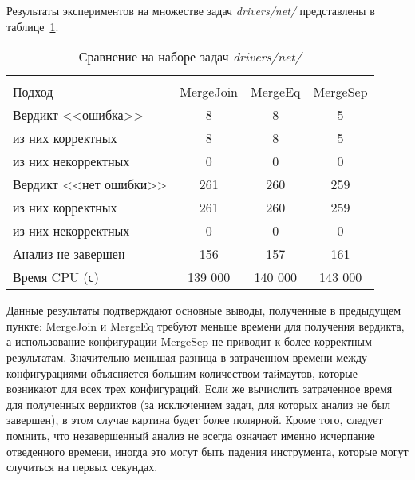 Результаты экспериментов на множестве задач \textit{drivers/net/} представлены в таблице~\ref{table-drivers-merge}.

  \begin{table}[h]\footnotesize \centering
    \caption{Сравнение на наборе задач \textit{drivers/net/}}
  	\label{table-drivers-merge}
    \begin{tabular}{ | l | c | c | c | }
      \hline
      		& 		\multicolumn{3}{c|}{\theoryraces}  \\
      Подход         				& MergeJoin	& MergeEq 	& MergeSep   \\ \hline
      Вердикт <<ошибка>> 				& 8	    	& 8  		& 5         \\ 
  \hspace{0.5cm} из них корректных 	& 8 		& 8 		& 5      \\ 
  \hspace{0.5cm} из них некорректных & 0 		& 0 		& 0        \\ \hline
      Вердикт <<нет ошибки>>  		& 261      	& 260       & 259       \\ 
  \hspace{0.5cm} из них корректных 	& 261 		& 260    	& 259        \\
  \hspace{0.5cm} из них некорректных & 0 		& 0    		& 0         \\ \hline
      Анализ не завершен       		& 156     	& 157        & 161       \\ \hline
      Время CPU (с)   				& 139 000 	& 140 000    & 143 000    \\ 
      \hline
    \end{tabular}
  \end{table}

Данные результаты подтверждают основные выводы, полученные в предыдущем пункте: MergeJoin и MergeEq требуют меньше времени для получения вердикта, а использование конфигурации MergeSep не приводит к более корректным результатам. 
Значительно меньшая разница в затраченном времени между конфигурациями объясняется большим количеством таймаутов, которые возникают для всех трех конфигураций. 
Если же вычислить затраченное время для полученных вердиктов (за исключением задач, для которых анализ не был завершен), в этом случае картина будет более полярной.
Кроме того, следует помнить, что незавершенный анализ не всегда означает именно исчерпание отведенного времени, иногда это могут быть падения инструмента, которые могут случиться на первых секундах.

